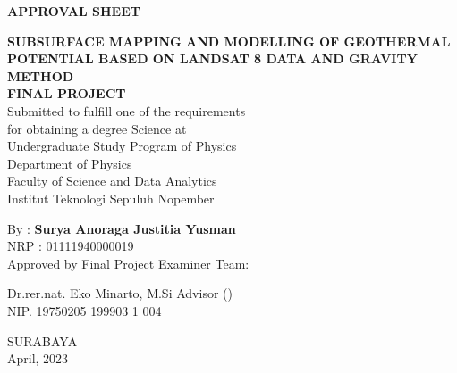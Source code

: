 \newpage
\thispagestyle{empty}
\begin{center}
	\textbf{APPROVAL SHEET}\\
	\vskip30pt
	
	\textbf{SUBSURFACE MAPPING AND MODELLING OF GEOTHERMAL POTENTIAL BASED ON LANDSAT 8 DATA AND GRAVITY METHOD}\\
	
	\vskip30pt
	\textbf{FINAL PROJECT}\\
	\doublespacing
	Submitted to fulfill one of the requirements\\
	for obtaining a degree Science at\\
	Undergraduate Study Program of Physics\\
	Department of Physics\\
	Faculty of Science and Data Analytics\\
	Institut Teknologi Sepuluh Nopember\\
	\vskip 20pt
	
	By : \textbf{Surya Anoraga Justitia Yusman}\\
	NRP : 01111940000019\\
	
	\vskip 50pt
	Approved by Final Project Examiner Team:
\end{center}
		\vskip 35pt
		Dr.rer.nat. Eko Minarto, M.Si \hfill Advisor \hfill (\dotfill)\\
		NIP. 19750205 199903 1 004
\begin{center}
	\vfill
	SURABAYA\\
	April, 2023
\end{center}

\restoregeometry
